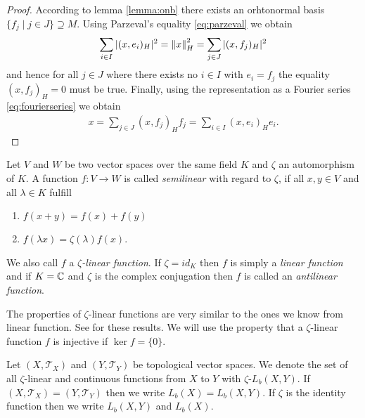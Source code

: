\begin{proof}
	According to lemma \ref{lemma:onb} there exists an orhtonormal basis $\{f_j \mid j \in J\} \supseteq M$. Using Parzeval's equality \eqref{eq:parzeval} we obtain
	\begin{align*}
		\sum_{i \in I} |(x, e_i)_H|^2 = \norm[H]{x}^2 = \sum_{j \in J} |(x,f_j)_H|^2
	\end{align*}
	and hence for all $j \in J$ where there exists no $i \in I$ with $e_i = f_j$ the equality $(x, f_j)_H = 0$ must be true. Finally, using the representation as a Fourier series \eqref{eq:fourierseries} we obtain
	\begin{align*}
		x = \sum_{j \in J} (x,f_j)_H f_j = \sum_{i \in I} (x,e_i)_H e_i.
	\end{align*}
\end{proof}



\begin{definition}
	Let $V$ and $W$ be two vector spaces over the same field $K$ and $\zeta$ an automorphism of $K$. A function $f: V \to W$ is called \textit{semilinear} with regard to $\zeta$, if all $x,y \in V$ and all $\lambda \in K$ fulfill
	\begin{enumerate}
		\item $f(x + y) = f(x) + f(y)$
		\item $f(\lambda x) = \zeta(\lambda) f(x)$.
	\end{enumerate}
	We also call $f$ a $\zeta$\textit{-linear function}. If $\zeta = id_K$ then $f$ is simply a \textit{linear function} and if $K = \C$ and $\zeta$ is the complex conjugation then $f$ is called an \textit{antilinear function}.
\end{definition}


\begin{remark}
	The properties of $\zeta$-linear functions are very similar to the ones we know from linear function. See \cite[p. 138]{LinAG1&2} for these results. We will use the property that a $\zeta$-linear function $f$ is injective if $\ker f = \{0\}$.
\end{remark}


\begin{definition}
	Let $(X,\mathcal{T}_X)$ and $(Y,\mathcal{T}_Y)$ be topological vector spaces. We denote the set of all $\zeta$-linear and continuous functions from $X$ to $Y$ with $\zeta$-$L_b(X,Y)$. If $(X, \mathcal{T}_X) = (Y, \mathcal{T}_Y)$ then we write $L_b(X) = L_b(X,Y)$. If $\zeta$ is the identity function then we write $L_b(X,Y)$ and $L_b(X)$.
\end{definition}


